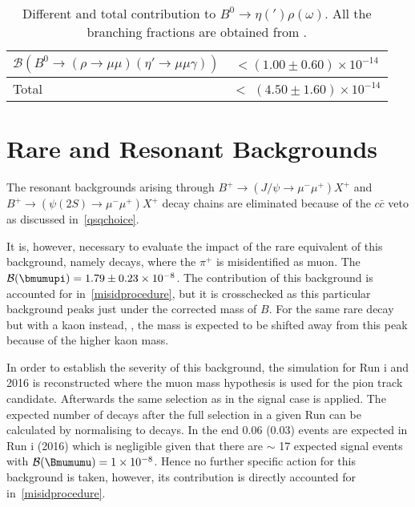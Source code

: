 \begin{table}[ht]
\begin{center}
\begin{tabular}{ l  c }
$\mathcal{B}(B^{0} \rightarrow (\rho \rightarrow \mu \mu) (\eta'\rightarrow \mu \mu \gamma))$ & $<$$(1.00\pm0.60)\times 10 ^{-14 }$ \\
\hline
Total  & $ <$ $(4.50\pm1.60)\times 10 ^{-14 }$ \\
\bottomrule
\end{tabular}
\end{center}
\caption{Different and total contribution to $B^{0} \rightarrow \eta(') \rho(\omega)$. All the branching fractions are obtained from \cite{Patrignani:2016xqp}.}
\label{tab:ed}
\end{table}


\section{Rare and Resonant  Backgrounds}
\label{rareandreso}
The resonant backgrounds arising through $B^{+} \rightarrow (J/\psi \rightarrow \mu^{-} \mu^{+}) X^{+}$ and $B^{+} \rightarrow (\psi(2S) \rightarrow \mu^{-} \mu^{+}) X^{+}$ decay chains are eliminated because of the $c\bar{c}$ veto as discussed in~\autoref{qsqchoice}.

It is, however, necessary to evaluate the impact of the rare equivalent of this background, namely \bmumupi decays, where the $\pi^{+}$ is misidentified as muon. The $\mathcal{B}(\bmumupi)=1.79\pm0.23\times 10^{-8}$\cite{Patrignani:2016xqp}. The contribution of this background is accounted for in\DIFdelbegin {}\DIFdelend ~\autoref{misidprocedure}, but it is crosschecked as this particular background peaks just under the corrected mass of \DIFaddbegin {}\DIFaddend $B$. For the same rare decay but with a kaon instead, \bmumuk, the mass is expected to be shifted away from this peak because of the higher kaon mass.

In order to establish the severity of this background, the \bmumupi simulation for Run \Rn{1} and 2016 is reconstructed where the muon mass hypothesis is used for the pion track candidate. %
Afterwards the same selection as in the signal case is applied. The expected number of \bmumupi decays after the full selection in a given Run can be calculated by normalising to \bjpsimumuk decays. In the end 0.06 (0.03) \bmumupi events are expected in Run \Rn{1} (2016) which is negligible given that there are $\sim$ 17 expected signal events with $\mathcal{B}(\Bmumumu)=1\times 10^{-8}$. Hence no further specific action for this background is taken, however, its contribution is directly accounted for in\DIFdelbegin {}\DIFdelend ~\autoref{misidprocedure}.

